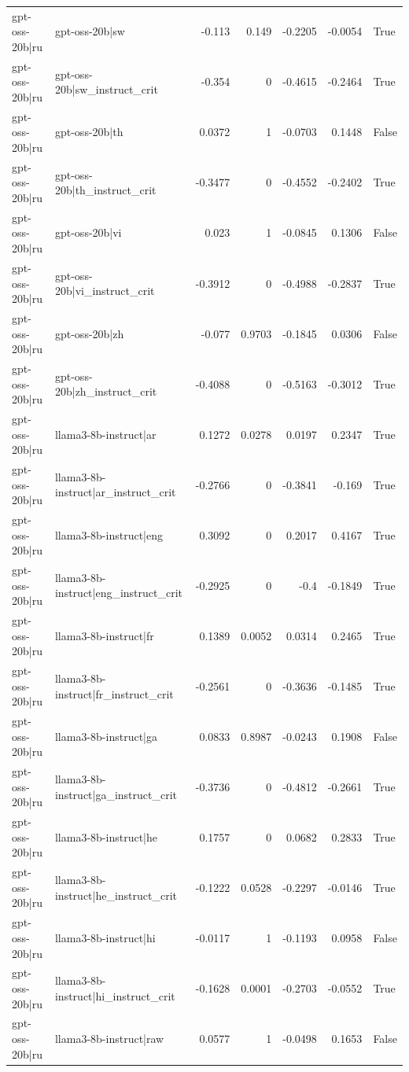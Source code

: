 \begin{table}
\begin{tabular}{l l r r r r l}
gpt-oss-20b|ru & gpt-oss-20b|sw & -0.113 & 0.149 & -0.2205 & -0.0054 & True \\
gpt-oss-20b|ru & gpt-oss-20b|sw_instruct_crit & -0.354 & 0 & -0.4615 & -0.2464 & True \\
gpt-oss-20b|ru & gpt-oss-20b|th & 0.0372 & 1 & -0.0703 & 0.1448 & False \\
gpt-oss-20b|ru & gpt-oss-20b|th_instruct_crit & -0.3477 & 0 & -0.4552 & -0.2402 & True \\
gpt-oss-20b|ru & gpt-oss-20b|vi & 0.023 & 1 & -0.0845 & 0.1306 & False \\
gpt-oss-20b|ru & gpt-oss-20b|vi_instruct_crit & -0.3912 & 0 & -0.4988 & -0.2837 & True \\
gpt-oss-20b|ru & gpt-oss-20b|zh & -0.077 & 0.9703 & -0.1845 & 0.0306 & False \\
gpt-oss-20b|ru & gpt-oss-20b|zh_instruct_crit & -0.4088 & 0 & -0.5163 & -0.3012 & True \\
gpt-oss-20b|ru & llama3-8b-instruct|ar & 0.1272 & 0.0278 & 0.0197 & 0.2347 & True \\
gpt-oss-20b|ru & llama3-8b-instruct|ar_instruct_crit & -0.2766 & 0 & -0.3841 & -0.169 & True \\
gpt-oss-20b|ru & llama3-8b-instruct|eng & 0.3092 & 0 & 0.2017 & 0.4167 & True \\
gpt-oss-20b|ru & llama3-8b-instruct|eng_instruct_crit & -0.2925 & 0 & -0.4 & -0.1849 & True \\
gpt-oss-20b|ru & llama3-8b-instruct|fr & 0.1389 & 0.0052 & 0.0314 & 0.2465 & True \\
gpt-oss-20b|ru & llama3-8b-instruct|fr_instruct_crit & -0.2561 & 0 & -0.3636 & -0.1485 & True \\
gpt-oss-20b|ru & llama3-8b-instruct|ga & 0.0833 & 0.8987 & -0.0243 & 0.1908 & False \\
gpt-oss-20b|ru & llama3-8b-instruct|ga_instruct_crit & -0.3736 & 0 & -0.4812 & -0.2661 & True \\
gpt-oss-20b|ru & llama3-8b-instruct|he & 0.1757 & 0 & 0.0682 & 0.2833 & True \\
gpt-oss-20b|ru & llama3-8b-instruct|he_instruct_crit & -0.1222 & 0.0528 & -0.2297 & -0.0146 & True \\
gpt-oss-20b|ru & llama3-8b-instruct|hi & -0.0117 & 1 & -0.1193 & 0.0958 & False \\
gpt-oss-20b|ru & llama3-8b-instruct|hi_instruct_crit & -0.1628 & 0.0001 & -0.2703 & -0.0552 & True \\
gpt-oss-20b|ru & llama3-8b-instruct|raw & 0.0577 & 1 & -0.0498 & 0.1653 & False \\

\end{tabular}
\end{table}
